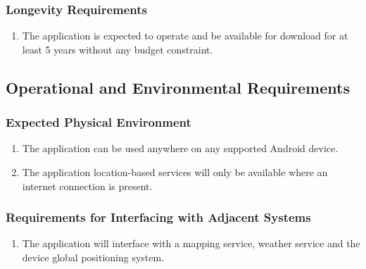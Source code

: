 \documentclass[titlepage]{article}
\newcounter{myCounter}
\begin{document}
\subsubsection{Longevity Requirements}
\label{ssub:longevity_requirements}
\begin{enumerate}[{PR}1. ]
    \setcounter{enumi}{\themyCounter}
    \item The application is expected to operate and be available for download for at least 5 years
    without any budget constraint.
    \setcounter{myCounter}{\theenumi}
\end{enumerate}


\subsection{Operational and Environmental Requirements}
\label{sub:operational_and_environmental_requirements}
\setcounter{myCounter}{0}

\subsubsection{Expected Physical Environment}
\label{ssub:expected_physical_environment}
\begin{enumerate}[{OE}1. ]
    \setcounter{enumi}{\themyCounter}
	\item The application can be used anywhere on any supported Android device.
    \item The application location-based services will only be available where an internet
    connection is present.
    \setcounter{myCounter}{\theenumi}
\end{enumerate}

\subsubsection{Requirements for Interfacing with Adjacent Systems}
\label{ssub:requirements_for_interfacing_with_adjacent_systems}
\begin{enumerate}[{OE}1. ]
    \setcounter{enumi}{\themyCounter}
    \item The application will interface with a mapping service, weather service and the device
    global positioning system.
    \setcounter{myCounter}{\theenumi}
\end{enumerate}
\end{document}
